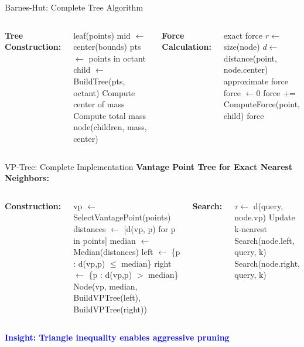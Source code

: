 \documentclass[aspectratio=169]{beamer}
\newcommand{\conceptbox}[2]{\colorbox{#1!20}{\textcolor{#1}{\textbf{#2}}}}
\newcommand{\insight}[1]{\conceptbox{blue}{Insight: #1}}
\begin{document}
\begin{frame}{Barnes-Hut: Complete Tree Algorithm}
\begin{columns}
\textbf{Tree Construction:}
\begin{algorithmic}[1]
\small
{}
    \State \Return leaf(points)
\EndIf
\State mid $\leftarrow$ center(bounds)
    \State pts $\leftarrow$ points in octant
    \State child $\leftarrow$ BuildTree(pts, octant)
\EndFor
\State Compute center of mass
\State Compute total mass
\State \Return node(children, mass, center)
\EndFunction
\end{algorithmic}

\textbf{Force Calculation:}
\begin{algorithmic}[1]
\small
{}
    \State \Return exact force
\EndIf
\State $r \leftarrow$ size(node)
\State $d \leftarrow$ distance(point, node.center)
    \State \Return approximate force
\Else
    \State force $\leftarrow 0$
        \State force += ComputeForce(point, child)
    \EndFor
    \State \Return force
\EndIf
\EndFunction
\end{algorithmic}
\end{columns}
\end{frame}

\begin{frame}{VP-Tree: Complete Implementation}
\textbf{Vantage Point Tree for Exact Nearest Neighbors:}

\begin{columns}
\textbf{Construction:}
\begin{algorithmic}[1]
\small
{}
\State vp $\leftarrow$ SelectVantagePoint(points)
\State distances $\leftarrow$ [d(vp, p) for p in points]
\State median $\leftarrow$ Median(distances)
\State left $\leftarrow$ \{p : d(vp,p) $\leq$ median\}
\State right $\leftarrow$ \{p : d(vp,p) $>$ median\}
\State \Return Node(vp, median, 
    BuildVPTree(left),
    BuildVPTree(right))
\EndFunction
\end{algorithmic}

\textbf{Search:}
\begin{algorithmic}[1]
\small
{}
\State $\tau \leftarrow$ d(query, node.vp)
    \State Update k-nearest
\EndIf
{}
    \State Search(node.left, query, k)
\EndIf
{}
    \State Search(node.right, query, k)
\EndIf
\EndFunction
\end{algorithmic}
\end{columns}

\insight{Triangle inequality enables aggressive pruning}
\end{frame}
\end{document}
